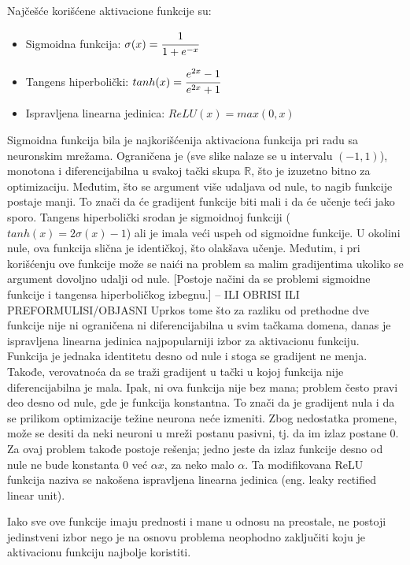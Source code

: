 \par
Najčešće korišćene aktivacione funkcije su:
\begin{itemize}
	\item Sigmoidna funkcija: $\sigma (x) = \cfrac{1}{1+e^{-x}}$
	\item Tangens hiperbolički: $tanh(x) = \cfrac{e^{2x}-1}{e^{2x}+1}$
	\item Ispravljena linearna jedinica: $ReLU(x) = max(0, x)$
\end{itemize}

Sigmoidna funkcija bila je najkorišćenija aktivaciona funkcija pri radu sa neuronskim mrežama. Ograničena je (sve slike nalaze se u intervalu $(-1, 1)$), monotona i diferencijabilna u svakoj tački skupa $\mathbb{R}$, što je izuzetno bitno za optimizaciju. Međutim, što se argument više udaljava od nule, to nagib funkcije postaje manji. To znači da će gradijent funkcije biti mali i da će učenje teći jako sporo. 
Tangens hiperbolički srodan je sigmoidnoj funkciji ($tanh(x) = 2\sigma (x) - 1$) ali je imala veći uspeh od sigmoidne funkcije.  U okolini nule, ova funkcija slična je identičkoj, što olakšava učenje. Međutim, i pri korišćenju ove funkcije može se naići na problem sa malim gradijentima ukoliko se argument dovoljno udalji od nule. [Postoje načini da se problemi sigmoidne funkcije i tangensa hiperboličkog izbegnu.] -- ILI OBRISI ILI PREFORMULISI/OBJASNI
Uprkos tome što za razliku od prethodne dve funkcije nije ni ograničena ni diferencijabilna u svim tačkama domena, danas je ispravljena linearna jedinica najpopularniji izbor za aktivacionu funkciju. Funkcija je jednaka identitetu desno od nule i stoga se gradijent ne menja. Takođe, verovatnoća da se traži gradijent u tački u kojoj funkcija nije diferencijabilna je mala. Ipak, ni ova funkcija nije bez mana; problem često pravi deo desno od nule, gde je funkcija konstantna. To znači da je gradijent nula i da se prilikom optimizacije težine neurona neće izmeniti. Zbog nedostatka promene, može se desiti da neki neuroni u mreži postanu pasivni, tj. da im izlaz postane $0$. Za ovaj problem takođe postoje rešenja; jedno jeste da izlaz funkcije desno od nule ne bude konstanta $0$ već $\alpha x$, za neko malo $\alpha$. Ta modifikovana ReLU funkcija naziva se nakošena ispravljena linearna jedinica (eng. leaky rectified linear unit). 
\par
Iako sve ove funkcije imaju prednosti i mane u odnosu na preostale, ne postoji jedinstveni izbor nego je na osnovu problema neophodno zaključiti koju je aktivacionu funkciju najbolje koristiti.

